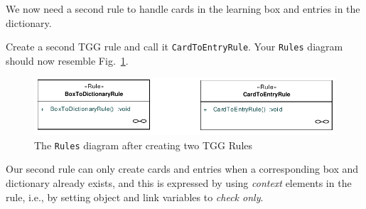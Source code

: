 We now need a second rule to handle cards in the learning box and entries in the dictionary.

Create a second TGG rule and call it \texttt{CardToEntryRule}.
Your \texttt{Rules} diagram should now resemble Fig.~\ref{fig:rules_diagram}.

\begin{figure}[htbp]
\begin{center}
  \includegraphics[width=\textwidth]{pics/tggBilder/tggRule/tgg16}
  \caption{The \texttt{Rules} diagram after creating two TGG Rules}  
  \label{fig:rules_diagram}
\end{center}
\end{figure}

Our second rule can only create cards and entries when a corresponding box and dictionary already exists, and this is expressed by using \emph{context} elements in the rule, i.e., by setting object and link variables to \emph{check only}.


